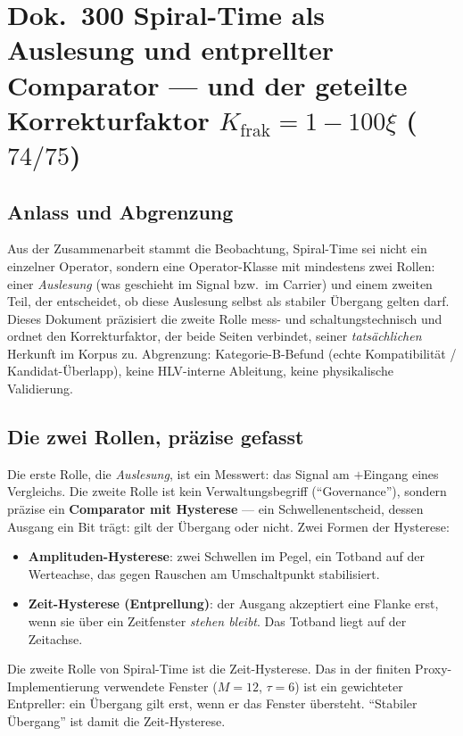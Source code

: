 
\section*{Dok.~300 \quad Spiral-Time als Auslesung und entprellter Comparator
--- und der geteilte Korrekturfaktor $K_{\text{frak}} = 1-100\xi$ ($74/75$)}

\subsection*{Anlass und Abgrenzung}

Aus der Zusammenarbeit stammt die Beobachtung, Spiral-Time sei nicht ein
einzelner Operator, sondern eine Operator-Klasse mit mindestens zwei Rollen:
einer \emph{Auslesung} (was geschieht im Signal bzw.\ im Carrier) und einem
zweiten Teil, der entscheidet, ob diese Auslesung selbst als stabiler
Übergang gelten darf. Dieses Dokument präzisiert die zweite Rolle mess- und
schaltungstechnisch und ordnet den Korrekturfaktor, der beide Seiten
verbindet, seiner \emph{tatsächlichen} Herkunft im Korpus zu. Abgrenzung:
Kategorie-B-Befund (echte Kompatibilität / Kandidat-Überlapp), keine
HLV-interne Ableitung, keine physikalische Validierung.

\subsection*{Die zwei Rollen, präzise gefasst}

Die erste Rolle, die \emph{Auslesung}, ist ein Messwert: das Signal am
$+$Eingang eines Vergleichs. Die zweite Rolle ist kein Verwaltungsbegriff
(\enquote{Governance}), sondern präzise ein \textbf{Comparator mit Hysterese}
--- ein Schwellenentscheid, dessen Ausgang ein Bit trägt: gilt der Übergang
oder nicht. Zwei Formen der Hysterese:
\begin{itemize}
  \item \textbf{Amplituden-Hysterese}: zwei Schwellen im Pegel, ein Totband
    auf der Werteachse, das gegen Rauschen am Umschaltpunkt stabilisiert.
  \item \textbf{Zeit-Hysterese (Entprellung)}: der Ausgang akzeptiert eine
    Flanke erst, wenn sie über ein Zeitfenster \emph{stehen bleibt}. Das
    Totband liegt auf der Zeitachse.
\end{itemize}
Die zweite Rolle von Spiral-Time ist die Zeit-Hysterese. Das in der finiten
Proxy-Implementierung verwendete Fenster ($M=12$, $\tau=6$) ist ein
gewichteter Entpreller: ein Übergang gilt erst, wenn er das Fenster übersteht.
\enquote{Stabiler Übergang} ist damit die Zeit-Hysterese.

